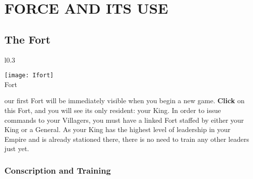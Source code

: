 
\chapter{\textsf{FORCE AND ITS USE}}


\section{\textsf{The Fort}}

\begin{wrapfigure}{l}{0.3\textwidth}
    \vspace{-20pt}
    \begin{center}
        \texttt{[image: Ifort]}
        \\ Fort
    \end{center}
    \vspace{-30pt} %
    \end{wrapfigure}

our first Fort will be immediately visible when you begin a new game. \textbf{Click} on this Fort, and you will see its only resident: your King. In order to issue commands to your Villagers, you must have a linked Fort staffed by either your King or a General. As your King has the highest level of leadership in your Empire and is already stationed there, there is no need to train any other leaders just yet.

\subsection{\textsf{Conscription and Training}}

